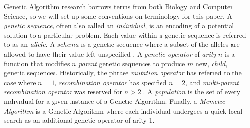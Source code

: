 Genetic Algorithm research borrows terms from both Biology and Computer Science, so we will set up some conventions on terminology for this paper. A \emph{genetic sequence}, often also called an \emph{individual}, is an encoding of a potential solution to a particular problem. Each value within a genetic sequence is referred to as an \emph{allele}. A \emph{schema} is a genetic sequence where a subset of the alleles are allowed to have their value left unspecified \cite{Russell10}. A \emph{genetic operator} of \emph{arity} $n$ is a function that modifies $n$ \emph{parent} genetic sequences to produce $m$ new, \emph{child}, genetic sequences. Historically, the phrase \emph{mutation operator} has referred to the case where $n = 1$, \emph{recombination operator} has specified $n = 2$, and \emph{multi-parent recombination operator} was reserved for $n > 2$ \cite{Eiben94}. A \emph{population} is the set of every individual for a given instance of a Genetic Algorithm. Finally, a \emph{Memetic Algorithm} is a Genetic Algorithm where each individual undergoes a quick local search as an additional genetic operator of arity 1.